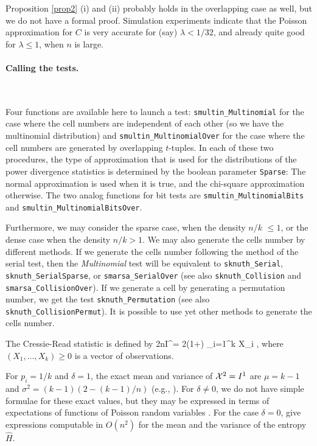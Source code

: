 Proposition \ref{prop2} (i) and (ii) probably holds in the overlapping
case as well, but we do not have a formal proof.
Simulation experiments indicate that the Poisson approximation 
for $C$ is very accurate for (say) $\lambda < 1/32$, and already
quite good for $\lambda\le 1$, when $n$ is large.

\paragraph*{Calling the tests.} \

Four functions are available here to launch a test:
{\tt smultin\_Multinomial} for the case where the cell numbers are
independent of each other (so we have the multinomial distribution)
and {\tt smultin\_MultinomialOver} for the case where the cell numbers
are generated by overlapping $t$-tuples. 
In each of these two procedures, the type of approximation that is used
for the distributions of the power divergence statistics is determined
by the boolean parameter {\tt Sparse}: The normal approximation is used
when it is true, and the chi-square approximation otherwise. The
two analog functions for bit tests are {\tt smultin\_MultinomialBits} and
{\tt smultin\_MultinomialBitsOver}.


\iffalse  %

Furthermore, we may consider the sparse  case, when the density
 $n/k$ $\le  1$,  or the dense case when the density $n/k > 1$.
 We may also generate the  cells number by different methods.
 If we generate the cells number following the method of the serial test,
 then the {\sl Multinomial} test will be equivalent to
 {\tt sknuth\_Serial}, {\tt sknuth\_SerialSparse}, or {\tt smarsa\_SerialOver}
 (see also {\tt sknuth\_Collision} and  {\tt smarsa\_CollisionOver}).
 If we generate a cell by generating a permutation number, we get the
 test {\tt sknuth\_Permutation} (see also {\tt sknuth\_CollisionPermut}). 
 It is possible to use yet other methods to generate the cells number.

The  Cressie-Read statistic \cite{tREA88a} is  defined by
\eq
  2nI^\delta = {2\over \delta(1+\delta)} \sum_{i=1}^k
              X_i ,
\endeq
 where $(X_1,\dots,X_k) \ge 0$ is a vector of observations.

For $p_i = 1/k$ and $\delta = 1$, the exact mean and variance 
of ${\cal X}^2 = I^1$ are $\mu = k-1$ and $\sigma^2 = (k-1)(2 - (k-1)/n)$
(e.g., \cite{tHAL37a,tKOE80a}).  %
For $\delta \not= 0$, we do not have  simple formulae for
these exact values, but they may be  expressed in terms of expectations
of functions of Poisson random variables \cite{tKOE80a,tREA88a}.
For the case $\delta = 0$, \cite{rLEC96e} give expressions
 computable in $O(n^2)$ for the mean and the variance of
the entropy $\hat H$.

